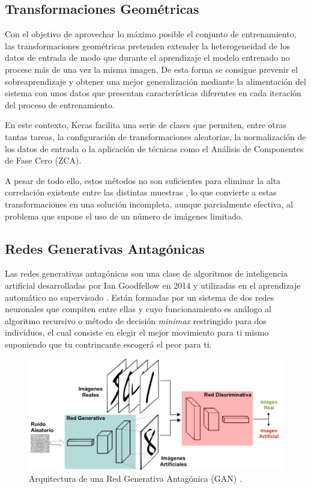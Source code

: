 \subsection{Transformaciones Geométricas} \label{Chapter:GeometricTransformations}

Con el objetivo de aprovechar lo máximo posible el conjunto de entrenamiento, las transformaciones geométricas pretenden extender la heterogeneidad de los datos de entrada de modo que durante el aprendizaje el modelo entrenado no procese más de una vez la misma imagen. De esta forma se consigue prevenir el sobreaprendizaje y obtener una mejor generalización mediante la alimentación del sistema con unos datos que presentan características diferentes en cada iteración del proceso de entrenamiento.

En este contexto, Keras facilita una serie de clases que permiten, entre otras tantas tareas, la configuración de transformaciones aleatorias, la normalización de los datos de entrada o la aplicación de técnicas como el Análisis de Componentes de Fase Cero (ZCA).

A pesar de todo ello, estos métodos no son suficientes para eliminar la alta correlación existente entre las distintas muestras \cite{ZCA}, lo que convierte a estas transformaciones en una solución incompleta, aunque parcialmente efectiva, al problema que supone el uso de un número de imágenes limitado.

\subsection{Redes Generativas Antagónicas}

Las redes generativas antagónicas son una clase de algoritmos de inteligencia artificial desarrolladas por Ian Goodfellow en 2014 y utilizadas en el aprendizaje automático no supervisado \cite{GAN}. Están formadas por un sistema de dos redes neuronales que compiten entre ellas y cuyo funcionamiento es análogo al algoritmo recursivo o método de decisión \textit{minimax} restringido para dos individuos, el cual consiste en elegir el mejor movimiento para ti mismo suponiendo que tu contrincante escogerá el peor para ti. 

\begin{figure}
    \centering
    \includegraphics[width=\textwidth]{Images/GAN.png}
    \caption{Arquitectura de una Red Generativa Antagónica (GAN) \cite{img:GAN}.}
    \label{fig:GAN}
\end{figure}

